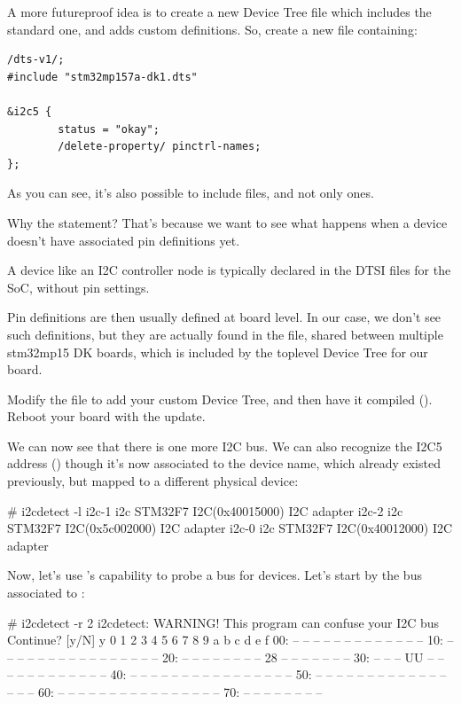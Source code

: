 A more futureproof idea is to create a new Device Tree file which
includes the standard one, and adds custom definitions. So, create a
new  file containing:

\begin{verbatim}
/dts-v1/;
#include "stm32mp157a-dk1.dts"

&i2c5 {
        status = "okay";
        /delete-property/ pinctrl-names;
};
\end{verbatim}

As you can see, it's also possible to include  files, and not
only  ones.

Why the  statement? That's because we want
to see what happens when a device doesn't have associated pin
definitions yet.

A device like an I2C controller node is typically declared in the
DTSI files for the SoC, without pin settings.

Pin definitions are then usually defined at board level.
In our case, we don't see such definitions, but they are actually
found in the 
file, shared between multiple stm32mp15 DK boards, which is included
by the toplevel Device Tree for our board.

Modify the  file to add your custom
Device Tree, and then have it compiled (). Reboot
your board with the update.

We can now see that there is one more I2C bus. We can also recognize the
I2C5 address () though it's now associated to
the  device name, which already existed previously, but
mapped to a different physical device:

\begin{bashinput}
# i2cdetect -l
i2c-1	i2c             STM32F7 I2C(0x40015000)                 I2C adapter
i2c-2	i2c             STM32F7 I2C(0x5c002000)                 I2C adapter
i2c-0	i2c             STM32F7 I2C(0x40012000)                 I2C adapter
\end{bashinput}

Now, let's use 's capability to probe a bus for devices.
Let's start by the bus associated to :

\begin{bashinput}
# i2cdetect -r 2
i2cdetect: WARNING! This program can confuse your I2C bus
Continue? [y/N] y
     0  1  2  3  4  5  6  7  8  9  a  b  c  d  e  f
00:          -- -- -- -- -- -- -- -- -- -- -- -- --
10: -- -- -- -- -- -- -- -- -- -- -- -- -- -- -- --
20: -- -- -- -- -- -- -- -- 28 -- -- -- -- -- -- --
30: -- -- -- UU -- -- -- -- -- -- -- -- -- -- -- --
40: -- -- -- -- -- -- -- -- -- -- -- -- -- -- -- --
50: -- -- -- -- -- -- -- -- -- -- -- -- -- -- -- --
60: -- -- -- -- -- -- -- -- -- -- -- -- -- -- -- --
70: -- -- -- -- -- -- -- --
\end{bashinput}


